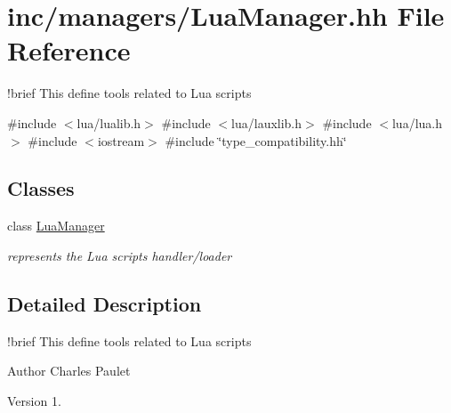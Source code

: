 \hypertarget{LuaManager_8hh}{}\section{inc/managers/\+Lua\+Manager.hh File Reference}
\label{LuaManager_8hh}


!brief This define tools related to Lua scripts  


{\ttfamily \#include $<$lua/lualib.\+h$>$}\newline
{\ttfamily \#include $<$lua/lauxlib.\+h$>$}\newline
{\ttfamily \#include $<$lua/lua.\+h$>$}\newline
{\ttfamily \#include $<$iostream$>$}\newline
{\ttfamily \#include \char`\"{}type\+\_\+compatibility.\+hh\char`\"{}}\newline
\subsection*{Classes}
\begin{DoxyCompactItemize}
\item 
class \hyperlink{classLuaManager}{Lua\+Manager}
\begin{DoxyCompactList}\small\item\em represents the Lua scripts handler/loader \end{DoxyCompactList}\end{DoxyCompactItemize}


\subsection{Detailed Description}
!brief This define tools related to Lua scripts 

\begin{DoxyAuthor}{Author}
Charles Paulet 
\end{DoxyAuthor}
\begin{DoxyVersion}{Version}
1. 
\end{DoxyVersion}
